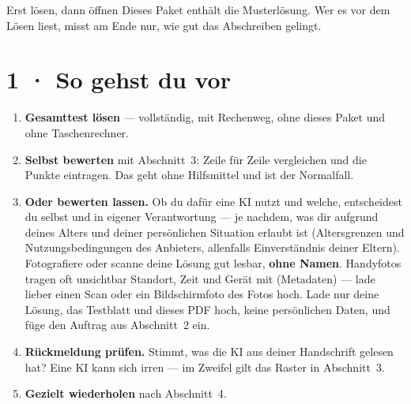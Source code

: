 \documentclass[11pt]{article}
\begin{document}

\begin{lpachtung}{Erst lösen, dann öffnen}
Dieses Paket enthält die Musterlösung. Wer es vor dem Lösen liest, misst am Ende nur, wie gut das Abschreiben gelingt.
\end{lpachtung}

\section*{1 · So gehst du vor}
\begin{enumerate}[leftmargin=*,itemsep=2pt]
\item \textbf{Gesamttest lösen} — vollständig, mit Rechenweg, ohne dieses Paket und ohne Taschenrechner.
\item \textbf{Selbst bewerten} mit Abschnitt~3: Zeile für Zeile vergleichen und die Punkte eintragen. Das geht ohne Hilfsmittel
  und ist der Normalfall.
\item \textbf{Oder bewerten lassen.} Ob du dafür eine KI nutzt und welche, entscheidest du selbst und in eigener Verantwortung —
  je nachdem, was dir aufgrund deines Alters und deiner persönlichen Situation erlaubt ist (Altersgrenzen und
  Nutzungsbedingungen des Anbieters, allenfalls Einverständnis deiner Eltern). Fotografiere oder scanne deine Lösung gut lesbar,
  \textbf{ohne Namen}. Handyfotos tragen oft unsichtbar Standort, Zeit und Gerät mit (Metadaten) — lade lieber einen Scan oder ein
  Bildschirmfoto des Fotos hoch. Lade nur deine Lösung, das Testblatt und dieses PDF hoch, keine persönlichen Daten, und füge den Auftrag aus
  Abschnitt~2 ein.
\item \textbf{Rückmeldung prüfen.} Stimmt, was die KI aus deiner Handschrift gelesen hat? Eine KI kann sich irren —
  im Zweifel gilt das Raster in Abschnitt~3.
\item \textbf{Gezielt wiederholen} nach Abschnitt~4.
\end{enumerate}
\end{document}

